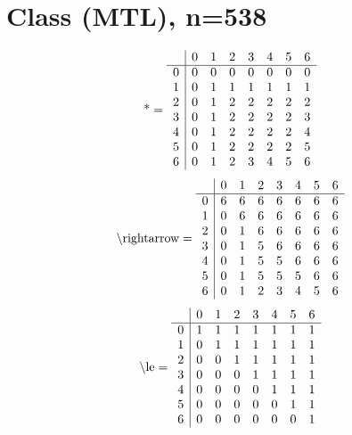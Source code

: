 \documentclass[11pt]{article}
\begin{document}
\section{Class (MTL), n=538}
\[\text{*} = 
\begin{array}{r | r r r r r r r}
 & 0 & 1 & 2 & 3 & 4 & 5 & 6 \\ \hline
0 & 0 & 0 & 0 & 0 & 0 & 0 & 0 \\
1 & 0 & 1 & 1 & 1 & 1 & 1 & 1 \\
2 & 0 & 1 & 2 & 2 & 2 & 2 & 2 \\
3 & 0 & 1 & 2 & 2 & 2 & 2 & 3 \\
4 & 0 & 1 & 2 & 2 & 2 & 2 & 4 \\
5 & 0 & 1 & 2 & 2 & 2 & 2 & 5 \\
6 & 0 & 1 & 2 & 3 & 4 & 5 & 6 \\
\end{array}
\]
\[\text{\textbackslash rightarrow} = 
\begin{array}{r | r r r r r r r}
 & 0 & 1 & 2 & 3 & 4 & 5 & 6 \\ \hline
0 & 6 & 6 & 6 & 6 & 6 & 6 & 6 \\
1 & 0 & 6 & 6 & 6 & 6 & 6 & 6 \\
2 & 0 & 1 & 6 & 6 & 6 & 6 & 6 \\
3 & 0 & 1 & 5 & 6 & 6 & 6 & 6 \\
4 & 0 & 1 & 5 & 5 & 6 & 6 & 6 \\
5 & 0 & 1 & 5 & 5 & 5 & 6 & 6 \\
6 & 0 & 1 & 2 & 3 & 4 & 5 & 6 \\
\end{array}
\]
\[\text{\textbackslash le} = 
\begin{array}{r | r r r r r r r}
 & 0 & 1 & 2 & 3 & 4 & 5 & 6 \\ \hline
0 & 1 & 1 & 1 & 1 & 1 & 1 & 1 \\
1 & 0 & 1 & 1 & 1 & 1 & 1 & 1 \\
2 & 0 & 0 & 1 & 1 & 1 & 1 & 1 \\
3 & 0 & 0 & 0 & 1 & 1 & 1 & 1 \\
4 & 0 & 0 & 0 & 0 & 1 & 1 & 1 \\
5 & 0 & 0 & 0 & 0 & 0 & 1 & 1 \\
6 & 0 & 0 & 0 & 0 & 0 & 0 & 1 \\
\end{array}
\]
\end{document}
